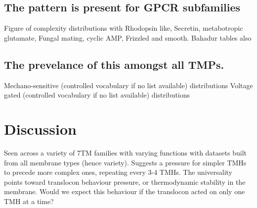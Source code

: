 \subsection{The pattern is present for GPCR subfamilies}
Figure of complexity distributions with Rhodopsin like, Secretin, metabotropic glutamate, Fungal mating, cyclic AMP, Frizzled and smooth.
Bahadur tables also

\subsection{The prevelance of this amongst all TMPs.}
Mechano-sensitive (controlled vocabulary if no list available) distributions
Voltage gated (controlled vocabulary if no list available) distributions

\section{Discussion}


Seen across a variety of 7TM families with varying functions with datasets built from all membrane types (hence variety).
Suggests a pressure for simpler TMHs to precede more complex ones, repeating every 3-4 TMHs.
The universality points toward translocon behaviour pressure, or thermodynamic stability in the membrane.
Would we expect this behaviour if the translocon acted on only one TMH at a time?
